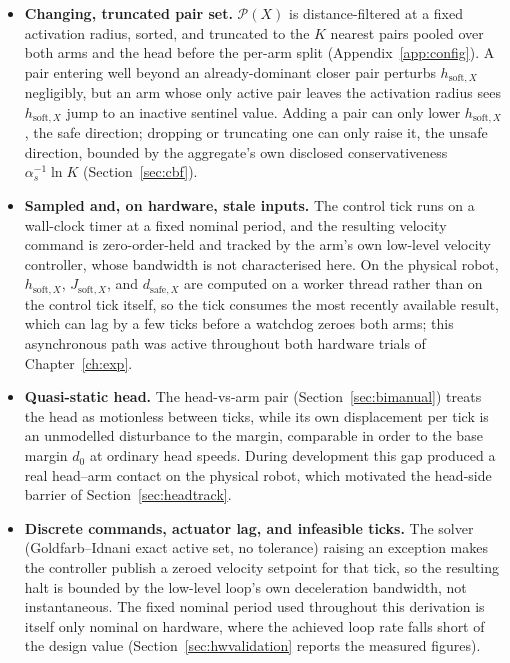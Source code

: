 \documentclass[12pt,a4paper,twoside,openright]{report}
\begin{document}
\begin{itemize}[nosep]
\item \textbf{Changing, truncated pair set.} $\mathcal{P}(X)$ is distance-filtered at a fixed activation radius, sorted, and truncated to the $K$ nearest pairs pooled over both arms and the head before the per-arm split (Appendix~\ref{app:config}). A pair entering well beyond an already-dominant closer pair perturbs $h_{\text{soft},X}$ negligibly, but an arm whose only active pair leaves the activation radius sees $h_{\text{soft},X}$ jump to an inactive sentinel value. Adding a pair can only lower $h_{\text{soft},X}$, the safe direction; dropping or truncating one can only raise it, the unsafe direction, bounded by the aggregate's own disclosed conservativeness $\alpha_s^{-1}\ln K$ (Section~\ref{sec:cbf}).
\item \textbf{Sampled and, on hardware, stale inputs.} The control tick runs on a wall-clock timer at a fixed nominal period, and the resulting velocity command is zero-order-held and tracked by the arm's own low-level velocity controller, whose bandwidth is not characterised here. On the physical robot, $h_{\text{soft},X}$, $J_{\text{soft},X}$, and $d_{\text{safe},X}$ are computed on a worker thread rather than on the control tick itself, so the tick consumes the most recently available result, which can lag by a few ticks before a watchdog zeroes both arms; this asynchronous path was active throughout both hardware trials of Chapter~\ref{ch:exp}.
\item \textbf{Quasi-static head.} The head-vs-arm pair (Section~\ref{sec:bimanual}) treats the head as motionless between ticks, while its own displacement per tick is an unmodelled disturbance to the margin, comparable in order to the base margin $d_0$ at ordinary head speeds. During development this gap produced a real head--arm contact on the physical robot, which motivated the head-side barrier of Section~\ref{sec:headtrack}.
\item \textbf{Discrete commands, actuator lag, and infeasible ticks.} The solver (Goldfarb--Idnani exact active set, no tolerance) raising an exception makes the controller publish a zeroed velocity setpoint for that tick, so the resulting halt is bounded by the low-level loop's own deceleration bandwidth, not instantaneous. The fixed nominal period used throughout this derivation is itself only nominal on hardware, where the achieved loop rate falls short of the design value (Section~\ref{sec:hwvalidation} reports the measured figures).
\end{itemize}
\end{document}
